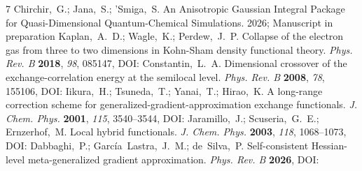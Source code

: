 \documentclass[journal=jctcce,manuscript=suppinfo]{achemso}
\begin{document}
\begin{mcitethebibliography}{7}
Chirchir,~G.; Jana,~S.; {'S}miga,~S. An Anisotropic Gaussian Integral Package
  for Quasi-Dimensional Quantum-Chemical Simulations. 2026; Manuscript in
  preparation\relax
\mciteBstWouldAddEndPuncttrue
\mciteSetBstMidEndSepPunct{\mcitedefaultmidpunct}
{\mcitedefaultendpunct}{\mcitedefaultseppunct}\relax
\EndOfBibitem
{}
Kaplan,~A.~D.; Wagle,~K.; Perdew,~J.~P. Collapse of the electron gas from three
  to two dimensions in {Kohn-Sham} density functional theory. \emph{Phys. Rev.
  B} \textbf{2018}, \emph{98}, 085147, DOI:
  \relax
\mciteBstWouldAddEndPuncttrue
\mciteSetBstMidEndSepPunct{\mcitedefaultmidpunct}
{\mcitedefaultendpunct}{\mcitedefaultseppunct}\relax
\EndOfBibitem
{}
Constantin,~L.~A. Dimensional crossover of the exchange-correlation energy at
  the semilocal level. \emph{Phys. Rev. B} \textbf{2008}, \emph{78}, 155106,
  DOI: \relax
\mciteBstWouldAddEndPuncttrue
\mciteSetBstMidEndSepPunct{\mcitedefaultmidpunct}
{\mcitedefaultendpunct}{\mcitedefaultseppunct}\relax
\EndOfBibitem
{}
Iikura,~H.; Tsuneda,~T.; Yanai,~T.; Hirao,~K. A long-range correction scheme
  for generalized-gradient-approximation exchange functionals. \emph{J. Chem.
  Phys.} \textbf{2001}, \emph{115}, 3540--3544, DOI:
  \relax
\mciteBstWouldAddEndPuncttrue
\mciteSetBstMidEndSepPunct{\mcitedefaultmidpunct}
{\mcitedefaultendpunct}{\mcitedefaultseppunct}\relax
\EndOfBibitem
{}
Jaramillo,~J.; Scuseria,~G.~E.; Ernzerhof,~M. Local hybrid functionals.
  \emph{J. Chem. Phys.} \textbf{2003}, \emph{118}, 1068--1073, DOI:
  \relax
\mciteBstWouldAddEndPuncttrue
\mciteSetBstMidEndSepPunct{\mcitedefaultmidpunct}
{\mcitedefaultendpunct}{\mcitedefaultseppunct}\relax
\EndOfBibitem
{}
Dabbaghi,~P.; Garc{\'i}a~Lastra,~J.~M.; de~Silva,~P. Self-consistent
  Hessian-level meta-generalized gradient approximation. \emph{Phys. Rev. B}
  \textbf{2026}, DOI: \relax
\mciteBstWouldAddEndPuncttrue
\mciteSetBstMidEndSepPunct{\mcitedefaultmidpunct}
{\mcitedefaultendpunct}{\mcitedefaultseppunct}\relax
\EndOfBibitem
\end{mcitethebibliography}
\end{document}

